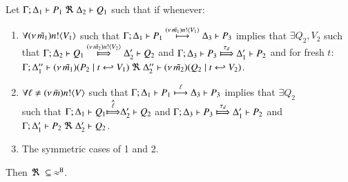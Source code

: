 \documentclass[runningheads]{llncs}
\begin{document}
{%



\begin{lemma}%
	\label{lem:up_to_deterministic_transition}
	Let $\Gamma; \Delta_1 \vdash P_1 \ \Re\  \Delta_2 \vdash Q_1$ such
	that if whenever:
%
	\begin{enumerate}[1.]
		\item	$\forall (\nu\, \tilde{m_1}) n ! \langle V_1 \rangle$ such that
			$
				\Gamma; \Delta_1 \vdash P_1 \stackrel{(\nu\, \tilde{m_1}) n ! \langle V_1 \rangle}{\longmapsto} \Delta_3 \vdash P_3
			$
			implies that $\exists Q_2, V_2$ such that
			$
				\horel{\Gamma}{\Delta_2}{Q_1}{\Hby{\news{\tilde{m_2}} \bactout{n}{V_2}}}{\Delta_2'}{Q_2}
			$
			and
			$
				\horel{\Gamma}{\Delta_3}{P_3}{\Hby{\dtau}}{\Delta_1'}{P_2}
			$
			and for fresh $t$:\\
			$
				\Gamma; \Delta_1'' \vdash (\nu\, \tilde{m_1})(P_2 \;|\; t \hookleftarrow V_1) \ \Re\  \Delta_2'' \vdash{(\nu\, \tilde{m_2})(Q_2 \;|\;t \hookleftarrow V_2)}
			$.
%
		\item	$\forall \ell \not= (\nu\, \tilde{m}) n ! \langle V \rangle$ such that
			$
				\Gamma; \Delta_1 \vdash P_1 \stackrel{\ell}{\longmapsto} \Delta_3 \vdash P_3
			$
			implies that $\exists Q_2$  \\ such that 
			$
				\horel{\Gamma}{\Delta_1}{Q_1}{\hat{\Hby{\ell}}}{\Delta_2'}{Q_2}
			$
			and
			$
				\horel{\Gamma}{\Delta_3}{P_3}{\Hby{\dtau}}{\Delta_1'}{P_2}
			$
			and
			$\Gamma; \Delta_1' \vdash P_2 \ \Re\  \Delta_2' \vdash Q_2$.

		\item	The symmetric cases of 1 and 2.
	\end{enumerate}
	Then $\Re\ \subseteq\ \approx^\mathtt{H}$.
\end{lemma}


}
\end{document}
